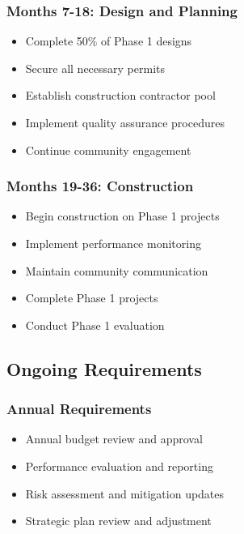 \documentclass[11pt,letterpaper]{article}
\begin{document}
\subsubsection{Months 7-18: Design and Planning}
\begin{itemize}
    \item[$\square$] Complete 50\% of Phase 1 designs
    \item[$\square$] Secure all necessary permits
    \item[$\square$] Establish construction contractor pool
    \item[$\square$] Implement quality assurance procedures
    \item[$\square$] Continue community engagement
\end{itemize}

\subsubsection{Months 19-36: Construction}
\begin{itemize}
    \item[$\square$] Begin construction on Phase 1 projects
    \item[$\square$] Implement performance monitoring
    \item[$\square$] Maintain community communication
    \item[$\square$] Complete Phase 1 projects
    \item[$\square$] Conduct Phase 1 evaluation
\end{itemize}

\subsection{Ongoing Requirements}

\subsubsection{Annual Requirements}
\begin{itemize}
    \item[$\square$] Annual budget review and approval
    \item[$\square$] Performance evaluation and reporting
    \item[$\square$} Stakeholder communication and updates
    \item[$\square$] Risk assessment and mitigation updates
    \item[$\square$] Strategic plan review and adjustment
\end{itemize}
\end{document}
